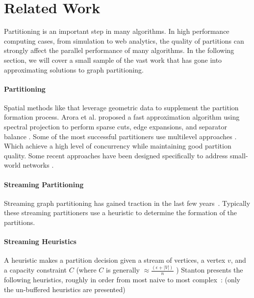 \section{Related Work}
Partitioning is an important step in many algorithms.
In high performance computing cases, from simulation to web analytics, the quality of partitions can strongly affect the parallel performance of many algorithms.
In the following section, we will cover a small sample of the vast work that has gone into approximating solutions to graph partitioning.

\paragraph{Partitioning}
Spatial methods like \cite{Gilbert95geometricmesh} that leverage geometric data to supplement the partition formation process.
Arora et al. proposed a fast approximation algorithm using spectral projection to perform sparse cuts, edge expansions, and separator balance \cite{arora2009expander}.
Some of the most successful partitioners use multilevel approaches \cite{karypis1998multilevel}.
Which achieve a high level of concurrency while maintaining good partition quality.
Some recent approaches have been designed specifically to address small-world networks \cite{slota2014pulp}.

\paragraph{Streaming Partitioning}
Streaming graph partitioning has gained traction in the last few years~\cite{DBLP:journals/corr/abs-1212-1121,Stanton:2012:SGP:2339530.2339722,tsourakakis2012fennel}.
Typically these streaming partitioners use a heuristic to determine the formation of the partitions.

\paragraph{Streaming Heuristics}
A heuristic makes a partition decision given a stream of vertices, a vertex $v$, and a capacity constraint $C$ (where $C$ is generally $\approx \frac{(\epsilon+|V|)}{n}$ )
Stanton presents the following heuristics, roughly in order from most naive to most complex~\cite{Stanton:2012:SGP:2339530.2339722}: (only the un-buffered heuristics are presented)


